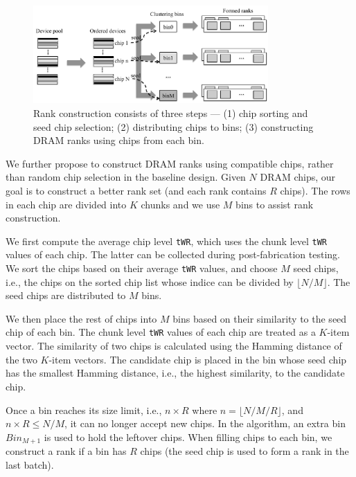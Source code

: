 \begin{figure}[ht]
\centering
\includegraphics[width=0.8\textwidth]{figures/device_match.pdf}
\vspace{-0.15in}
\caption{Rank construction consists of three steps --- (1) chip sorting and seed chip selection;
(2) distributing chips to bins; (3) constructing DRAM ranks using chips from each bin.}
\label{fig:device_match}
  \vspace{-0.25in}
\end{figure}

We further propose to construct DRAM ranks using compatible chips, rather than random chip selection in the baseline design. 
Given $N$ DRAM chips, our goal is to construct a better rank set (and each rank contains $R$ chips). The rows in each chip are divided into $K$ chunks and we use $M$ bins to assist rank construction.

We first compute the average chip level {\tt tWR}, which uses the chunk level {\tt tWR} values of each chip. The latter can be collected during post-fabrication testing.
We sort the chips based on their average {\tt tWR} values, and choose $M$ seed chips, i.e., the chips on the sorted chip list whose indice can be divided by $\lfloor N/M\rfloor$. The seed chips are distributed to $M$ bins.

We then place the rest of chips into $M$ bins based on their similarity to the seed chip of each bin. The chunk level {\tt tWR} values of each chip are treated as a $K$-item vector. The similarity of two chips is calculated using the Hamming distance of the two $K$-item vectors. The candidate chip is placed in the bin whose seed chip has the smallest Hamming distance, i.e., the highest similarity, to the candidate chip.

Once a bin reaches its size limit, i.e., $n\times R$  where $n = \lfloor{N/M/R}\rfloor$, and $n\times R \leq N/M$, it can no longer accept new chips. In the algorithm, an extra bin $Bin_{M+1}$ is used to hold the leftover chips.
When filling chips to each bin, we construct a rank if a bin has $R$ chips (the seed chip is used to form a rank in the last batch). 

